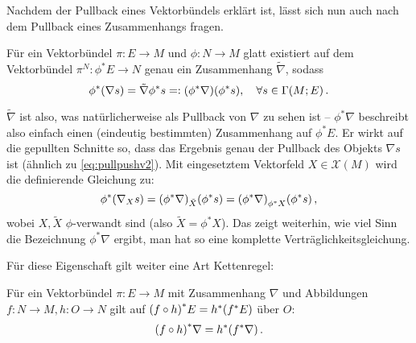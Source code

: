 \documentclass[../H_Analysis_main.tex]{subfiles}
\begin{document}
Nachdem der Pullback eines Vektorbündels erklärt ist, lässt sich nun auch nach dem Pullback eines Zusammenhangs fragen.

\begin{satz}
Für ein Vektorbündel $\pi: E \rightarrow M$ und $\phi: N \rightarrow M$ glatt existiert auf dem Vektorbündel $\pi^N: \phi^* E \rightarrow N$ genau ein Zusammenhang $\tilde{\nabla}$, sodass
\begin{equation}
\phi^* \qty(\nabla s) = \tilde{\nabla} \phi^* s =: \qty(\phi^* \nabla) \qty(\phi^* s), \quad \forall s \in \Gamma(M; E) \, .
\end{equation}
\end{satz}

$\tilde{\nabla}$ ist also, was natürlicherweise als Pullback von $\nabla$ zu sehen ist -- $\phi^* \nabla$ beschreibt also einfach einen (eindeutig bestimmten) Zusammenhang auf $\phi^* E$. Er wirkt auf die gepullten Schnitte so, dass das Ergebnis genau der Pullback des Objekts $\nabla s$ ist (ähnlich zu \eqref{eq:pullpushv2}). Mit eingesetztem Vektorfeld $X \in \mathcal{X}(M)$ wird die definierende Gleichung zu:
\begin{equation}
\phi^* \qty(\nabla_X s) = \qty(\phi^* \nabla)_{\tilde{X}} \qty(\phi^* s) = \qty(\phi^* \nabla)_{\phi^* X} \qty(\phi^* s) \, ,
\end{equation}
wobei $X, \tilde{X}$ $\phi$-verwandt sind (also $\tilde{X} = \phi^* X$). Das zeigt weiterhin, wie viel Sinn die Bezeichnung $\phi^* \nabla$ ergibt, man hat so eine komplette Verträglichkeitsgleichung.

Für diese Eigenschaft gilt weiter eine Art Kettenregel:
\begin{satz}
Für ein Vektorbündel $\pi: E \rightarrow M$ mit Zusammenhang $\nabla$ und Abbildungen $f: N \rightarrow M, h: O \rightarrow N$ gilt auf $\qty(f \circ h)^* E = h^* \qty(f^* E)$ über $O$:
\begin{equation}
\qty(f \circ h)^* \nabla = h^* \qty(f^* \nabla) \, .
\end{equation}
\end{satz}
\end{document}
